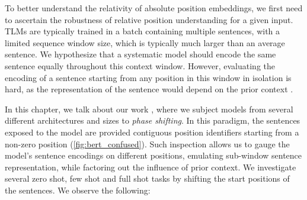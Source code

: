 \documentclass[letterpaper, 12pt]{report}
\begin{document}
To better understand the relativity of absolute position embeddings, we first need to ascertain the robustness of relative position understanding for a given input.
TLMs are typically trained in a batch containing multiple sentences, with a limited sequence window size, which is typically much larger than an average sentence.
We hypothesize that a systematic model should encode the same sentence equally throughout this context window.
However, evaluating the encoding of a sentence starting from any position in this window in isolation is hard, as the representation of the sentence would depend on the prior context \cite{misra2020exploring,kassner-schutze-2020-negated}.

In this chapter, we talk about our work \cite{sinha2022pos}, where we subject models from several different architectures and sizes to \textit{phase shifting}.
In this paradigm, the sentences exposed to the model are provided contiguous position identifiers starting from a non-zero position (\autoref{fig:bert_confused}).
Such inspection allows us to gauge the model's sentence encodings on different positions, emulating sub-window sentence representation, while factoring out the influence of prior context.
We investigate several zero shot, few shot and full shot tasks by shifting the start positions of the sentences. We observe the following:
\end{document}
